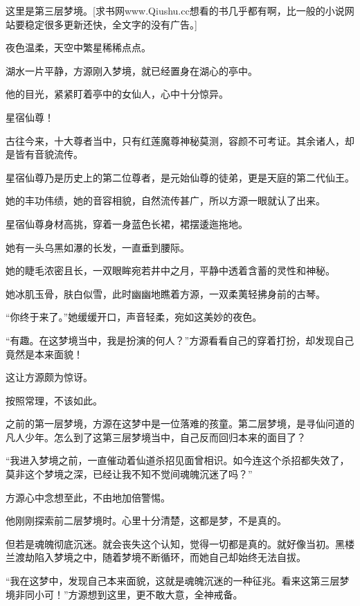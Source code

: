 
\begin{this_body}

这里是第三层梦境。[求书网www.Qiushu.cc想看的书几乎都有啊，比一般的小说网站要稳定很多更新还快，全文字的没有广告。]

夜色温柔，天空中繁星稀稀点点。

湖水一片平静，方源刚入梦境，就已经置身在湖心的亭中。

他的目光，紧紧盯着亭中的女仙人，心中十分惊异。

星宿仙尊！

古往今来，十大尊者当中，只有红莲魔尊神秘莫测，容颜不可考证。其余诸人，却是皆有音貌流传。

星宿仙尊乃是历史上的第二位尊者，是元始仙尊的徒弟，更是天庭的第二代仙王。

她的丰功伟绩，她的音容相貌，自然流传甚广，所以方源一眼就认了出来。

星宿仙尊身材高挑，穿着一身蓝色长裙，裙摆逶迤拖地。

她有一头乌黑如瀑的长发，一直垂到腰际。

她的睫毛浓密且长，一双眼眸宛若井中之月，平静中透着含蓄的灵性和神秘。

她冰肌玉骨，肤白似雪，此时幽幽地瞧着方源，一双柔荑轻拂身前的古琴。

“你终于来了。”她缓缓开口，声音轻柔，宛如这美妙的夜色。

“有趣。在这梦境当中，我是扮演的何人？”方源看看自己的穿着打扮，却发现自己竟然是本来面貌！

这让方源颇为惊讶。

按照常理，不该如此。

之前的第一层梦境，方源在这梦中是一位落难的孩童。第二层梦境，是寻仙问道的凡人少年。怎么到了这第三层梦境当中，自己反而回归本来的面目了？

“我进入梦境之前，一直催动着仙道杀招见面曾相识。如今连这个杀招都失效了，莫非这个梦境之深，已经让我不知不觉间魂魄沉迷了吗？”

方源心中念想至此，不由地加倍警惕。

他刚刚探索前二层梦境时。心里十分清楚，这都是梦，不是真的。

但若是魂魄彻底沉迷。就会丧失这个认知，觉得一切都是真的。就好像当初。黑楼兰渡劫陷入梦境之中，随着梦境不断循环，而她自己却始终无法自拔。

“我在这梦中，发现自己本来面貌，这就是魂魄沉迷的一种征兆。看来这第三层梦境非同小可！”方源想到这里，更不敢大意，全神戒备。


\end{this_body}
